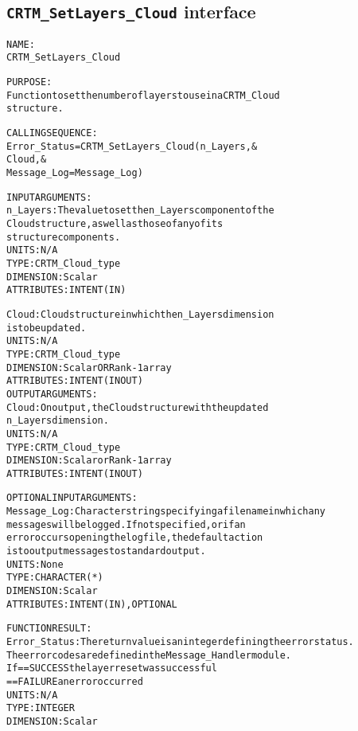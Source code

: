 \subsection{\texttt{CRTM\_SetLayers\_Cloud} interface}
  \label{sec:CRTM_SetLayers_Cloud_interface}
  \begin{alltt}
 
  NAME:
        CRTM_SetLayers_Cloud
  
  PURPOSE:
        Function to set the number of layers to use in a CRTM_Cloud
        structure.
 
  CALLING SEQUENCE:
        Error_Status = CRTM_SetLayers_Cloud( n_Layers               , &
                                             Cloud                  , &
                                             Message_Log=Message_Log  )
 
  INPUT ARGUMENTS:
        n_Layers:     The value to set the n_Layers component of the 
                      Cloud structure, as well as those of any of its
                      structure components.
                      UNITS:      N/A
                      TYPE:       CRTM_Cloud_type
                      DIMENSION:  Scalar
                      ATTRIBUTES: INTENT(IN)
 
        Cloud:        Cloud structure in which the n_Layers dimension
                      is to be updated.
                      UNITS:      N/A
                      TYPE:       CRTM_Cloud_type
                      DIMENSION:  Scalar OR Rank-1 array
                      ATTRIBUTES: INTENT(IN OUT)
  OUTPUT ARGUMENTS:
        Cloud:        On output, the Cloud structure with the updated
                      n_Layers dimension.
                      UNITS:      N/A
                      TYPE:       CRTM_Cloud_type
                      DIMENSION:  Scalar or Rank-1 array
                      ATTRIBUTES: INTENT(IN OUT)
 
  OPTIONAL INPUT ARGUMENTS:
        Message_Log:  Character string specifying a filename in which any
                      messages will be logged. If not specified, or if an
                      error occurs opening the log file, the default action
                      is to output messages to standard output.
                      UNITS:      None
                      TYPE:       CHARACTER(*)
                      DIMENSION:  Scalar
                      ATTRIBUTES: INTENT(IN), OPTIONAL
 
  FUNCTION RESULT:
        Error_Status: The return value is an integer defining the error status.
                      The error codes are defined in the Message_Handler module.
                      If == SUCCESS the layer reset was successful
                         == FAILURE an error occurred
                      UNITS:      N/A
                      TYPE:       INTEGER
                      DIMENSION:  Scalar
 

\end{alltt}
